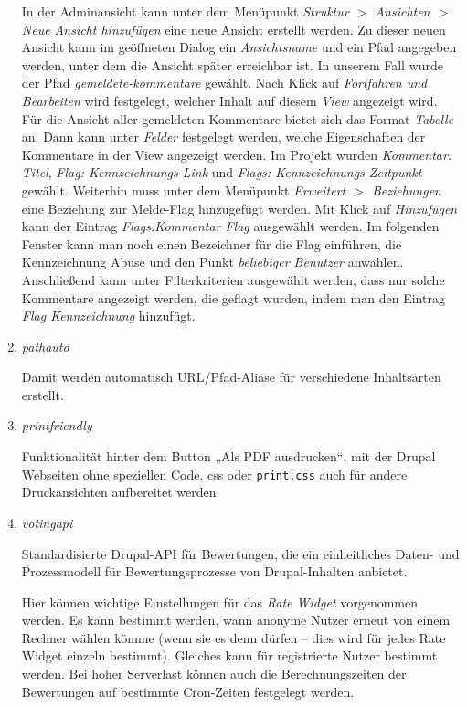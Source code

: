 \documentclass[a4paper,11pt,twoside]{article}
\begin{document}
\begin{enumerate}
In der Adminansicht kann unter dem Menüpunkt \textit{Struktur $>$ Ansichten
  $>$ Neue Ansicht hinzufügen} eine neue Ansicht erstellt werden. Zu dieser
neuen Ansicht kann im geöffneten Dialog ein \textit{Ansichtsname} und ein Pfad
angegeben werden, unter dem die Ansicht später erreichbar ist.  In unserem
Fall wurde der Pfad \textit{gemeldete-kommentare} gewählt. Nach Klick auf
\textit{Fortfahren und Bearbeiten} wird festgelegt, welcher Inhalt auf diesem
\textit{View} angezeigt wird. Für die Ansicht aller gemeldeten Kommentare
bietet sich das Format \textit{Tabelle} an. Dann kann unter \textit{Felder}
festgelegt werden, welche Eigenschaften der Kommentare in der View angezeigt
werden. Im Projekt wurden \textit{Kommentar: Titel}, \textit{Flag:
  Kennzeichnungs-Link} und \textit{Flags: Kennzeichnungs-Zeitpunkt}
gewählt. Weiterhin muss unter dem Menüpunkt \textit{Erweitert $>$ Beziehungen}
eine Beziehung zur Melde-Flag hinzugefügt werden. Mit Klick auf
\textit{Hinzufügen} kann der Eintrag \textit{Flags:Kommentar Flag} ausgewählt
werden. Im folgenden Fenster kann man noch einen Bezeichner für die Flag
einführen, die Kennzeichnung Abuse und den Punkt \textit{beliebiger Benutzer}
anwählen. Anschließend kann unter Filterkriterien ausgewählt werden, dass nur
solche Kommentare angezeigt werden, die geflagt wurden, indem man den Eintrag
\textit{Flag Kennzeichnung} hinzufügt.

\item \emph{pathauto}

Damit werden automatisch URL/Pfad-Aliase für verschiedene Inhaltsarten
erstellt.

\item \emph{printfriendly}

Funktionalität hinter dem Button „Als PDF ausdrucken“, mit der Drupal Webseiten
ohne speziellen Code, css oder \texttt{print.css} auch für andere
Druckansichten aufbereitet werden.

\item \emph{votingapi}

Standardisierte Drupal-API für Bewertungen, die ein einheitliches Daten- und
Prozessmodell für Bewertungsprozesse von Drupal-Inhalten anbietet.

Hier können wichtige Einstellungen für das \emph{Rate Widget} vorgenommen
werden.  Es kann bestimmt werden, wann anonyme Nutzer erneut von einem Rechner
wählen könnne (wenn sie es denn dürfen -- dies wird für jedes Rate Widget
einzeln bestimmt).  Gleiches kann für registrierte Nutzer bestimmt werden. Bei
hoher Serverlast können auch die Berechnungszeiten der Bewertungen auf
bestimmte Cron-Zeiten festgelegt werden.


\end{enumerate}
\end{document}
